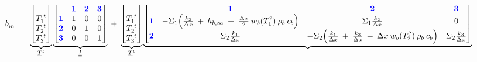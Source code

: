 \begin{landscape}
\begin{center}
{\begin{minipage}{10cm}
					\hspace{-1.8cm}
					\begin{minipage}{1.4\columnwidth}
					\Large{ 
						\begin{gather*}
							\underline{b}_m
							\;=\;
							\underbrace{
									\begin{bmatrix}
										\phantom{   }\\
										T_1^{\; t} \\
										T_2^{\; t} \\
										T_3^{\; t} 
									\end{bmatrix}
							}_{\underline{T}^{t}}
							\underbrace{
									\begin{array}{@{}c@{}}
										\begin{bmatrix}
											& \textcolor{blue}{\textbf{1}} & \textcolor{blue}{\textbf{2}} & \textcolor{blue}{\textbf{3}}  \\
											\textcolor{blue}{\textbf{1}} & 1 & 0 & 0  \\
											\textcolor{blue}{\textbf{2}} & 0 & 1 & 0 \\
											\textcolor{blue}{\textbf{3}} & 0 & 0 & 1  \\
										\end{bmatrix}
									\end{array}
							}_{\underline{\underline{I}}}
							\;+\;	
							\underbrace{								
									\begin{bmatrix}
										\phantom{   }\\
										T_1^{\; t} \\
										T_2^{\; t} \\
										T_3^{\; t} 
									\end{bmatrix}									
							}_{\underline{T}^{t}}
							\underbrace{
									\begin{array}{@{}c@{}}
							\begin{bmatrix}
								& \textcolor{blue}{\textbf{1}} & \textcolor{blue}{\textbf{2}} & \textcolor{blue}{\textbf{3}}  \\
								\textcolor{blue}{\textbf{1}} & -\Sigma_1 \Big( \frac{k_{2}}{\Delta x} \:+\: h_{b,\infty} \;+\;  \frac{\Delta x}{2} \:  w_b (T_1^?) \: \rho _b \: c_b \Big) & \Sigma_1 \frac{k_{2}}{\Delta x} & 0  \\
								\textcolor{blue}{\textbf{2}} & \Sigma_2 \frac{k_{1}}{\Delta x} &  -\Sigma_2 \Big(\frac{k_{1}}{\Delta x}  \:+\: \frac{k_{3}}{\Delta x} \:+\:  \Delta x \: w_b (T_2^?) \: \rho _b \: c_b \Big) & \Sigma_2 \frac{k_{3}}{\Delta x}\\

\end{bmatrix}
\end{array}}
\end{gather*}}
\end{minipage}
\end{minipage}}
\end{center}
\end{landscape}
